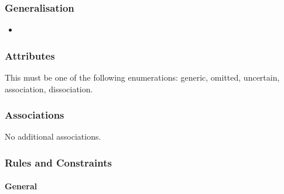 \subsubsection{Generalisation}

\begin{itemize}
\item {}
\end{itemize}

\subsubsection{Attributes}

\begin{attributes}
   This must be one of the following
  enumerations: generic, omitted, uncertain, association, dissociation.
\end{attributes}

\subsubsection{Associations}

No additional associations.

\subsubsection{Rules and Constraints}

\paragraph{General}

